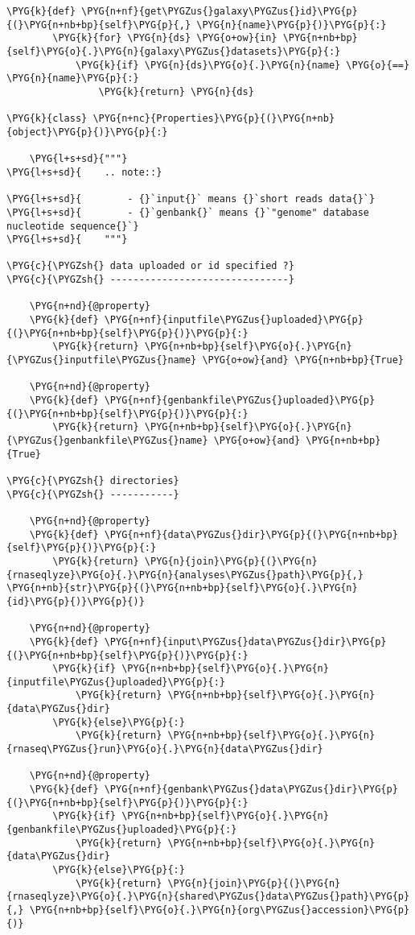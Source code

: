 \begin{Verbatim}[commandchars=\\\{\}]
    \PYG{k}{def} \PYG{n+nf}{get\PYGZus{}galaxy\PYGZus{}id}\PYG{p}{(}\PYG{n+nb+bp}{self}\PYG{p}{,} \PYG{n}{name}\PYG{p}{)}\PYG{p}{:}
        \PYG{k}{for} \PYG{n}{ds} \PYG{o+ow}{in} \PYG{n+nb+bp}{self}\PYG{o}{.}\PYG{n}{galaxy\PYGZus{}datasets}\PYG{p}{:}
            \PYG{k}{if} \PYG{n}{ds}\PYG{o}{.}\PYG{n}{name} \PYG{o}{==} \PYG{n}{name}\PYG{p}{:}
                \PYG{k}{return} \PYG{n}{ds}

\PYG{k}{class} \PYG{n+nc}{Properties}\PYG{p}{(}\PYG{n+nb}{object}\PYG{p}{)}\PYG{p}{:}

    \PYG{l+s+sd}{"""}
\PYG{l+s+sd}{    .. note::}

\PYG{l+s+sd}{        - {}`input{}` means {}`short reads data{}`}
\PYG{l+s+sd}{        - {}`genbank{}` means {}`"genome" database nucleotide sequence{}`}
\PYG{l+s+sd}{    """}

\PYG{c}{\PYGZsh{} data uploaded or id specified ?}
\PYG{c}{\PYGZsh{} -------------------------------}

    \PYG{n+nd}{@property}
    \PYG{k}{def} \PYG{n+nf}{inputfile\PYGZus{}uploaded}\PYG{p}{(}\PYG{n+nb+bp}{self}\PYG{p}{)}\PYG{p}{:}
        \PYG{k}{return} \PYG{n+nb+bp}{self}\PYG{o}{.}\PYG{n}{\PYGZus{}inputfile\PYGZus{}name} \PYG{o+ow}{and} \PYG{n+nb+bp}{True}

    \PYG{n+nd}{@property}
    \PYG{k}{def} \PYG{n+nf}{genbankfile\PYGZus{}uploaded}\PYG{p}{(}\PYG{n+nb+bp}{self}\PYG{p}{)}\PYG{p}{:}
        \PYG{k}{return} \PYG{n+nb+bp}{self}\PYG{o}{.}\PYG{n}{\PYGZus{}genbankfile\PYGZus{}name} \PYG{o+ow}{and} \PYG{n+nb+bp}{True}

\PYG{c}{\PYGZsh{} directories}
\PYG{c}{\PYGZsh{} -----------}

    \PYG{n+nd}{@property}
    \PYG{k}{def} \PYG{n+nf}{data\PYGZus{}dir}\PYG{p}{(}\PYG{n+nb+bp}{self}\PYG{p}{)}\PYG{p}{:}
        \PYG{k}{return} \PYG{n}{join}\PYG{p}{(}\PYG{n}{rnaseqlyze}\PYG{o}{.}\PYG{n}{analyses\PYGZus{}path}\PYG{p}{,} \PYG{n+nb}{str}\PYG{p}{(}\PYG{n+nb+bp}{self}\PYG{o}{.}\PYG{n}{id}\PYG{p}{)}\PYG{p}{)}

    \PYG{n+nd}{@property}
    \PYG{k}{def} \PYG{n+nf}{input\PYGZus{}data\PYGZus{}dir}\PYG{p}{(}\PYG{n+nb+bp}{self}\PYG{p}{)}\PYG{p}{:}
        \PYG{k}{if} \PYG{n+nb+bp}{self}\PYG{o}{.}\PYG{n}{inputfile\PYGZus{}uploaded}\PYG{p}{:}
            \PYG{k}{return} \PYG{n+nb+bp}{self}\PYG{o}{.}\PYG{n}{data\PYGZus{}dir}
        \PYG{k}{else}\PYG{p}{:}
            \PYG{k}{return} \PYG{n+nb+bp}{self}\PYG{o}{.}\PYG{n}{rnaseq\PYGZus{}run}\PYG{o}{.}\PYG{n}{data\PYGZus{}dir}

    \PYG{n+nd}{@property}
    \PYG{k}{def} \PYG{n+nf}{genbank\PYGZus{}data\PYGZus{}dir}\PYG{p}{(}\PYG{n+nb+bp}{self}\PYG{p}{)}\PYG{p}{:}
        \PYG{k}{if} \PYG{n+nb+bp}{self}\PYG{o}{.}\PYG{n}{genbankfile\PYGZus{}uploaded}\PYG{p}{:}
            \PYG{k}{return} \PYG{n+nb+bp}{self}\PYG{o}{.}\PYG{n}{data\PYGZus{}dir}
        \PYG{k}{else}\PYG{p}{:}
            \PYG{k}{return} \PYG{n}{join}\PYG{p}{(}\PYG{n}{rnaseqlyze}\PYG{o}{.}\PYG{n}{shared\PYGZus{}data\PYGZus{}path}\PYG{p}{,} \PYG{n+nb+bp}{self}\PYG{o}{.}\PYG{n}{org\PYGZus{}accession}\PYG{p}{)}


\end{Verbatim}
